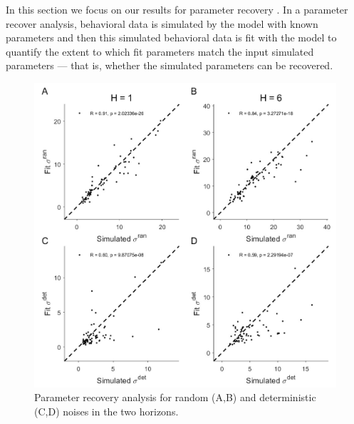 \documentclass[12pt]{article}
\begin{document}
{In this section we focus on our results for parameter recovery \citep{Wilson2019}. In a parameter recover analysis, behavioral data is simulated by the model with known parameters and then this simulated behavioral data is fit with the model to quantify the extent to which fit parameters match the input simulated parameters --- that is, whether the simulated parameters can be recovered.  
	
\begin{figure}[H]
	\begin{center}
		\includegraphics[width=.95\textwidth]{figures/RDBayes_parameterrecovery_subject_examplesession_randet.jpg}
		\caption{Parameter recovery analysis for random (A,B) and deterministic (C,D) noises in the two horizons.}
		\label{fig:paramrecover_main}
	\end{center}
\end{figure}

}
\end{document}
